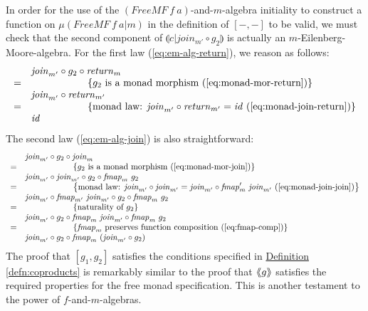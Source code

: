 \documentclass{jfp1}
\newcommand{\eFold}[2]{\llparenthesis #1|#2 \rrparenthesis}
\newcommand{\fmext}[1]{\langle\kern-0.25em\langle #1 \rangle\kern-0.25em\rangle}
\newcommand{\eqAnnotation}[1]{\hspace{2cm}\left\{\textrm{#1}\right\}}
\newcommand{\defref}[1]{\hyperref[#1]{Definition \ref*{#1}}}
\begin{document}
In order for the use of the $(\mathit{FreeMF}~f~a)$-and-$m$-algebra
initiality to construct a function on $\mu(\mathit{FreeMF}~f~a|m)$ in
the definition of $[-,-]$ to be valid, we must check that the second
component of $\eFold{c}{\mathit{join_{m'}} \circ g_2}$ is actually an
$m$-Eilenberg-Moore-algebra. For the first law
(\autoref{eq:em-alg-return}), we reason as follows:
\begin{displaymath}
  \begin{array}{cl}
    & \mathit{join}_{m'} \circ g_2 \circ \mathit{return}_m \\
    =&\eqAnnotation{$g_2$ is a monad morphism (\autoref{eq:monad-mor-return})} \\
    & \mathit{join}_{m'} \circ \mathit{return}_{m'} \\
    =&\eqAnnotation{monad law: $\mathit{join}_{m'} \circ \mathit{return}_{m'} = \mathit{id}$ (\autoref{eq:monad-join-return})} \\
    & \mathit{id}
  \end{array}
\end{displaymath}
The second law (\autoref{eq:em-alg-join}) is also straightforward:
\begin{displaymath}
  \begin{array}{cl}
    & \mathit{join}_{m'} \circ g_2 \circ \mathit{join}_m \\
    =&\eqAnnotation{$g_2$ is a monad morphism (\autoref{eq:monad-mor-join})} \\
    & \mathit{join}_{m'} \circ \mathit{join}_{m'} \circ g_2 \circ \mathit{fmap}_m~g_2 \\
    =&\eqAnnotation{monad law: $\mathit{join}_{m'} \circ \mathit{join}_{m'} = \mathit{join}_{m'} \circ \mathit{fmap}_m'~\mathit{join}_{m'}$ (\autoref{eq:monad-join-join})} \\
    & \mathit{join}_{m'} \circ \mathit{fmap}_{m'}~\mathit{join}_{m'} \circ g_2 \circ \mathit{fmap}_m~g_2 \\
    =&\eqAnnotation{naturality of $g_2$} \\
    & \mathit{join}_{m'} \circ g_2 \circ \mathit{fmap}_{m}~\mathit{join}_{m'} \circ \mathit{fmap}_m~g_2 \\
    =&\eqAnnotation{$\mathit{fmap}_m$ preserves function composition (\autoref{eq:fmap-comp})} \\
    & \mathit{join}_{m'} \circ g_2 \circ \mathit{fmap}_{m}~(\mathit{join}_{m'} \circ g_2)
  \end{array}
\end{displaymath}
The proof that $[g_1,g_2]$ satisfies the conditions specified in
\defref{defn:coproducts} is remarkably similar to the proof that
$\fmext{g}$ satisfies the required properties for the free monad
specification. This is another testament to the power of
$f$-and-$m$-algebras.
\end{document}
